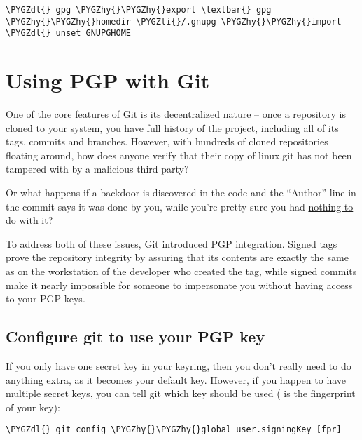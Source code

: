 \documentclass[a4paper,8pt,english]{sphinxmanual}
\def\PYGZdl{\char`\$}
\def\PYGZhy{\char`\-}
\def\PYGZti{\char`\~}
\begin{document}
\begin{Verbatim}[commandchars=\\\{\}]
\PYGZdl{} gpg \PYGZhy{}\PYGZhy{}export \textbar{} gpg \PYGZhy{}\PYGZhy{}homedir \PYGZti{}/.gnupg \PYGZhy{}\PYGZhy{}import
\PYGZdl{} unset GNUPGHOME
\end{Verbatim}


\section{Using PGP with Git}
\label{process/maintainer-pgp-guide:using-pgp-with-git}
One of the core features of Git is its decentralized nature -- once a
repository is cloned to your system, you have full history of the
project, including all of its tags, commits and branches. However, with
hundreds of cloned repositories floating around, how does anyone verify
that their copy of linux.git has not been tampered with by a malicious
third party?

Or what happens if a backdoor is discovered in the code and the ``Author''
line in the commit says it was done by you, while you're pretty sure you
had \href{https://github.com/jayphelps/git-blame-someone-else}{nothing to do with it}?

To address both of these issues, Git introduced PGP integration. Signed
tags prove the repository integrity by assuring that its contents are
exactly the same as on the workstation of the developer who created the
tag, while signed commits make it nearly impossible for someone to
impersonate you without having access to your PGP keys.


\subsection{Configure git to use your PGP key}
\label{process/maintainer-pgp-guide:nothing-to-do-with-it}\label{process/maintainer-pgp-guide:configure-git-to-use-your-pgp-key}
If you only have one secret key in your keyring, then you don't really
need to do anything extra, as it becomes your default key.  However, if
you happen to have multiple secret keys, you can tell git which key
should be used (\code{{[}fpr{]}} is the fingerprint of your key):

\begin{Verbatim}[commandchars=\\\{\}]
\PYGZdl{} git config \PYGZhy{}\PYGZhy{}global user.signingKey [fpr]
\end{Verbatim}
\end{document}
